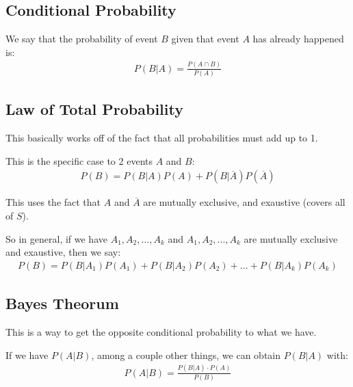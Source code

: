 \documentclass[12pt,letterpaper]{article} \usepackage{amsmath} \usepackage{graphicx} \usepackage[margin=1in]{geometry} \usepackage{longtable}  \usepackage{amssymb}
\begin{document}
	\subsection{Conditional Probability}
	We say that the probability of event $B$ given that event $A$ has already happened is:
	\begin{align*}
		P(B|A) = \frac{P(A\cap B)}{P(A)}
	\end{align*}
	
	\subsection{Law of Total Probability}
	This basically works off of the fact that all probabilities must add up to 1. 
	
	This is the specific case to 2 events $A$ and $B$:
	\begin{align*}
		P(B) = P(B|A)P(A) + P(B|\overline A)P(\overline A)
	\end{align*}

	This uses the fact that $A$ and $\overline A$ are mutually exclusive, and exaustive (covers all of $S$). 
	
	So in general, if we have $A_1, A_2, ..., A_k$ and $A_1, A_2, ..., A_k$ are mutually exclusive and exaustive, then we say:
	\begin{align*}
		P(B) = P(B|A_1)P(A_1) + P(B|A_2)P(A_2) + ... + P(B|A_k)P(A_k)
	\end{align*}
	
	\subsection{Bayes Theorum}
	This is a way to get the opposite conditional probability to what we have. 
	
	If we have $P(A|B)$, among a couple other things, we can obtain $P(B|A)$ with:
	\begin{align*}
		P(A|B) = \frac{P(B|A)\cdot P(A)}{P(B)}
	\end{align*}
	
\end{document}
